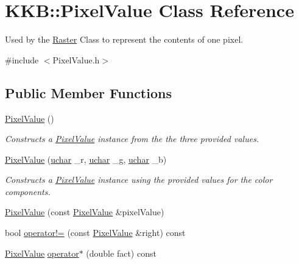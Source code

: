 \hypertarget{class_k_k_b_1_1_pixel_value}{}\section{K\+KB\+:\+:Pixel\+Value Class Reference}
\label{class_k_k_b_1_1_pixel_value}


Used by the \hyperlink{class_k_k_b_1_1_raster}{Raster} Class to represent the contents of one pixel.  




{\ttfamily \#include $<$Pixel\+Value.\+h$>$}

\subsection*{Public Member Functions}
\begin{DoxyCompactItemize}
\item 
\hyperlink{class_k_k_b_1_1_pixel_value_a3e6b509cdcc604c2df9cdde0d9b7f30e}{Pixel\+Value} ()
\begin{DoxyCompactList}\small\item\em Constructs a \textquotesingle{}\hyperlink{class_k_k_b_1_1_pixel_value}{Pixel\+Value}\textquotesingle{} instance from the the three provided values. \end{DoxyCompactList}\item 
\hyperlink{class_k_k_b_1_1_pixel_value_a472a67aa0defc4b2d3b4f743e71aa18e}{Pixel\+Value} (\hyperlink{namespace_k_k_b_ace9969169bf514f9ee6185186949cdf7}{uchar} \+\_\+r, \hyperlink{namespace_k_k_b_ace9969169bf514f9ee6185186949cdf7}{uchar} \+\_\+g, \hyperlink{namespace_k_k_b_ace9969169bf514f9ee6185186949cdf7}{uchar} \+\_\+b)
\begin{DoxyCompactList}\small\item\em Constructs a \textquotesingle{}\hyperlink{class_k_k_b_1_1_pixel_value}{Pixel\+Value}\textquotesingle{} instance using the provided values for the color components. \end{DoxyCompactList}\item 
\hyperlink{class_k_k_b_1_1_pixel_value_ae9af8faf5436ce01c7b0ffe4e38e55cb}{Pixel\+Value} (const \hyperlink{class_k_k_b_1_1_pixel_value}{Pixel\+Value} \&pixel\+Value)
\item 
bool \hyperlink{class_k_k_b_1_1_pixel_value_ac8a481df12eec3a256a6d8603dabbd54}{operator!=} (const \hyperlink{class_k_k_b_1_1_pixel_value}{Pixel\+Value} \&right) const 
\item 
\hyperlink{class_k_k_b_1_1_pixel_value}{Pixel\+Value} \hyperlink{class_k_k_b_1_1_pixel_value_aae3fb46e958c91cff8ccdc5b661f6fc5}{operator$\ast$} (double fact) const 

\end{DoxyCompactItemize}
